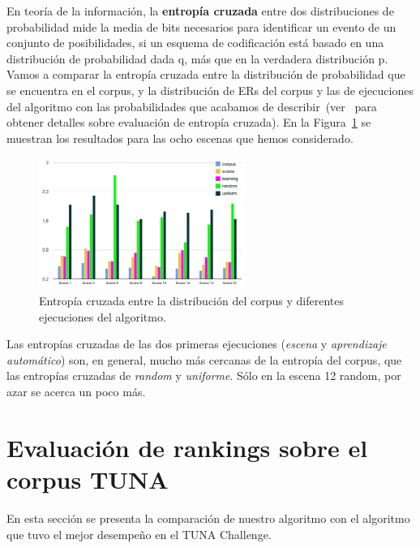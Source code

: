 En teor\'ia de la informaci\'on, la \textbf{entrop\'ia cruzada} entre dos distribuciones de probabilidad mide la media de bits necesarios para identificar un evento de un conjunto de posibilidades, si un esquema de codificaci\'on est\'a basado en una distribuci\'on de probabilidad dada q, m\'as que en la verdadera distribuci\'on p. Vamos a comparar la entrop\'ia cruzada entre la distribuci\'on de probabilidad que se encuentra en el corpus, y la distribuci\'on de ERs del corpus y las de ejecuciones del algoritmo con las probabilidades que acabamos de describir~(ver~\cite{juraksky:spee08} para obtener detalles sobre evaluaci\'on de entrop\'{i}a cruzada). En la Figura~\ref{Entropy} se muestran los resultados para las ocho escenas que hemos considerado.

\begin{figure}[h]
\centering
\includegraphics[width=0.6\textwidth]{images/entropy.jpg}
\caption{Entrop\'ia cruzada entre la distribuci\'on del corpus y diferentes ejecuciones del algoritmo.}\label{Entropy}
\end{figure}
  
Las entrop\'{i}as cruzadas de las dos primeras ejecuciones (\emph{escena} y \emph{aprendizaje autom\'atico}) son, en general, mucho m\'as cercanas de la entrop\'{i}a del corpus, que las entrop\'ias cruzadas de \emph{random} y \emph{uniforme}. S\'olo en la escena 12 random, por azar se acerca un poco m\'as.
\newpage
\section{Evaluaci\'on de rankings sobre el corpus TUNA} \label{sec:automaticevaluation}

En esta secci\'on se presenta la comparaci\'on de nuestro algoritmo con el algoritmo que tuvo el mejor desempe\~no en el TUNA Challenge. 

